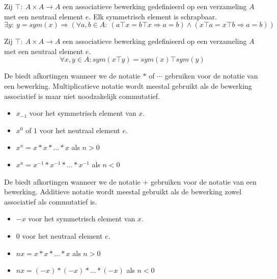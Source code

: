 \documentclass[main.tex]{subfiles}
\begin{document}
\begin{st}
  Zij $\top:\ A\times A\rightarrow A$ een associatieve bewerking gedefinieerd op een verzameling $A$ met een neutraal element $e$.
  Elk symmetrisch element is schrapbaar.
  \[ \exists y:\ y = sym(x) \Rightarrow (\forall a,b \in A:\ (a\top x = b \top x \Rightarrow a = b) \wedge( x\top a = x \top b \Rightarrow a = b)) \]

\end{st}

\begin{st}
  Zij $\top:\ A\times A\rightarrow A$ een associatieve bewerking gedefinieerd op een verzameling $A$ met een neutraal element $e$.
  \[ \forall x, y \in A: sym(x\top y) = sym(x) \top sym(y) \]

\end{st}


\begin{de}
  De  biedt afkortingen wanneer we de notatie $*$ of $\cdots$ gebruiken voor de notatie van een bewerking.
  Multiplicatieve notatie wordt meestal gebruikt als de bewerking associatief is maar niet noodzakelijk commutatief.
  \begin{itemize}
  \item $x_{-1}$ voor het symmetrisch element van $x$.
  \item $x^{0}$ of $1$ voor het neutraal element $e$.
  \item $x^{n} = x * x * \dotsc * x$ als $n > 0$
  \item $x^{n} = x^{-1} * x^{-1} * \dotsc * x^{-1}$ als $n < 0$
  \end{itemize}
\end{de}

\begin{de}
  De  biedt afkortingen wanneer we de notatie $+$ gebruiken voor de notatie van een bewerking.
  Additieve notatie wordt meestal gebruikt als de bewerking zowel associatief als commutatief is.
  \begin{itemize}
  \item $-x$ voor het symmetrisch element van $x$.
  \item $0$ voor het neutraal element $e$.
  \item $nx = x * x * \dotsc * x$ als $n > 0$
  \item $nx = (-x) * (-x) * \dotsc * (-x)$ als $n < 0$
  \end{itemize}
\end{de}
\end{document}
